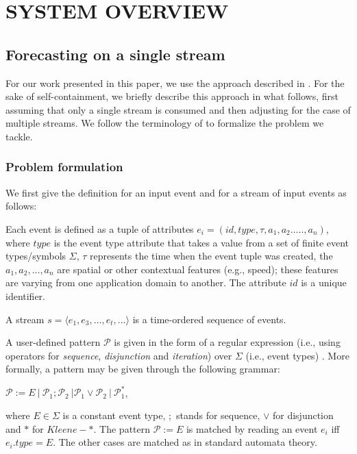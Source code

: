 \section{SYSTEM OVERVIEW}
\label{sec:system}
\subsection{Forecasting on a single stream}

For our work presented in this paper,
we use the approach described in \cite{alevizos2017event}.
For the sake of self-containment,
we briefly describe this approach in what follows,
first assuming that only a single stream is consumed
and then adjusting for the case of multiple streams.
We follow the terminology of \cite{luckham2008power,alevizos2015complex,zhou2015pattern} to formalize the problem we tackle.

\subsubsection{Problem formulation}

We first give the definition for an input event and for a stream of input events as follows:  
\begin{definition}
	Each event is defined as a tuple of attributes $e_i = (id,type,\tau,a_1,a_2.....,a_n)$, where $type$ is the event type attribute that takes a value from a set of finite event types/symbols $\Sigma$, $\tau$ represents the time when the event tuple was created,  the  $a_1,a_2,...,a_n$ are spatial or other contextual features (e.g., speed); these features are varying from one application domain to another. The attribute $id$ is a unique identifier.
\end{definition}

\begin{definition}
A stream $s=\langle e_1,e_3,...,e_t,...\rangle$  is a time-ordered sequence of events.
\end{definition}

\par A user-defined pattern $\mathcal{P}$ is given in the form of a regular expression (i.e., using operators for \textit{sequence}, \textit{disjunction} and \textit{iteration}) over $\Sigma$ (i.e., event types) \cite{alevizos2017event}.
More formally, a pattern may be given through the following grammar:
\begin{definition}
$\mathcal{P} := E\ |\ \mathcal{P}_{1} ; \mathcal{P}_{2}\ | \mathcal{P}_{1} \vee \mathcal{P}_{2}\ |\ \mathcal{P}_{1}^{*}  $,

where $E \in \Sigma$ is a constant event type, $;$ stands for sequence, $\vee$ for disjunction and $*$ for $\mathit{Kleene}-*$.
The pattern $\mathcal{P} := E$ is matched by reading an event $e_i$ iff $e_{i}.type = E$.
The other cases are matched as in standard automata theory.
\end{definition}


